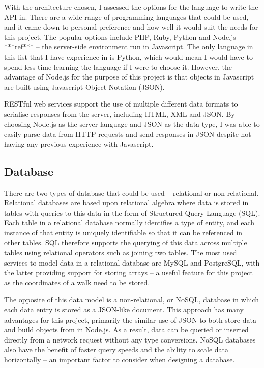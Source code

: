 With the architecture chosen, I assessed the options for the language to write the API in. There are a wide range of programming languages that could be used, and it came down to personal preference and how well it would suit the needs for this project. The popular options include PHP, Ruby, Python and Node.js ***ref*** -- the server-side environment run in Javascript. The only language in this list that I have experience in is Python, which would mean I would have to spend less time learning the language if I were to choose it. However, the advantage of Node.js for the purpose of this project is that objects in Javascript are built using Javascript Object Notation (JSON).

 RESTful web services support the use of multiple different data formats to serialise responses from the server, including HTML, XML and JSON. By choosing Node.js as the server language and JSON as the data type, I was able to easily parse data from HTTP requests and send responses in JSON despite not having any previous experience with Javascript.

\subsection{Database}

There are two types of database that could be used -- relational or non-relational. Relational databases are based upon relational algebra where data is stored in tables with queries to this data in the form of Structured Query Language (SQL). Each table in a relational database normally identifies a type of entity, and each instance of that entity is uniquely identifiable so that it can be referenced in other tables. SQL therefore supports the querying of this data across multiple tables using relational operators such as joining two tables. The most used services to model data in a relational database are MySQL and PostgreSQL, with the latter providing support for storing arrays -- a useful feature for this project as the coordinates of a walk need to be stored.

The opposite of this data model is a non-relational, or NoSQL, database in which each data entry is stored as a JSON-like document. This approach has many advantages for this project, primarily the similar use of JSON to both store data and build objects from in Node.js. As a result, data can be queried or inserted directly from a network request without any type conversions. NoSQL databases also have the benefit of faster query speeds and the ability to scale data horizontally -- an important factor to consider when designing a database.

